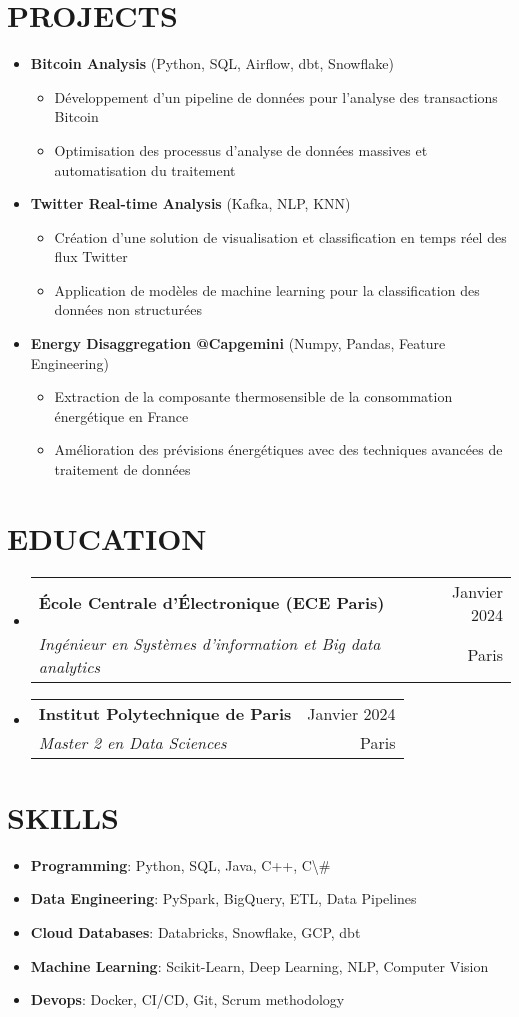 \documentclass[letterpaper,11pt]{article}
\makeatletter
\newcommand{\resumeItem}[1]{
  \item\small{
    {#1 \vspace{-1pt}}
  }
}
\newcommand{\resumeSubheading}[4]{
  \vspace{-1pt}\item
    \begin{tabular*}{\textwidth}[t]{l@{\extracolsep{\fill}}r}
      \textbf{#1} & {\color{dark-grey}\small #2}\vspace{1pt}\\
      \textit{#3} & {\color{dark-grey} \small #4}\\
    \end{tabular*}\vspace{-4pt}
}
\newcommand{\resumeProjectHeading}[2]{
  \item
  {#1} \hfill {#2}
}
\newcommand{\resumeSubHeadingListStart}{\begin{itemize}[leftmargin=0in, label={}]}
\newcommand{\resumeSubHeadingListEnd}{\end{itemize}}
\newcommand{\resumeItemListStart}{\begin{itemize}}
\newcommand{\resumeItemListEnd}{\end{itemize}\vspace{0pt}}
\makeatother
\begin{document}
\section{PROJECTS}
\resumeSubHeadingListStart
      \resumeProjectHeading
          {\textbf{Bitcoin Analysis} \small{(Python, SQL, Airflow, dbt, Snowflake)}} {}
          \resumeItemListStart
            \resumeItem{Développement d'un pipeline de données pour l'analyse des transactions Bitcoin}
            \resumeItem{Optimisation des processus d'analyse de données massives et automatisation du traitement}
          \resumeItemListEnd
      \resumeProjectHeading
          {\textbf{Twitter Real-time Analysis} \small{(Kafka, NLP, KNN)}} {}
          \resumeItemListStart
            \resumeItem{Création d'une solution de visualisation et classification en temps réel des flux Twitter}
            \resumeItem{Application de modèles de machine learning pour la classification des données non structurées}
          \resumeItemListEnd
      \resumeProjectHeading
          {\textbf{Energy Disaggregation @Capgemini} \small{(Numpy, Pandas, Feature Engineering)}} {}
          \resumeItemListStart
            \resumeItem{Extraction de la composante thermosensible de la consommation énergétique en France}
            \resumeItem{Amélioration des prévisions énergétiques avec des techniques avancées de traitement de données}
          \resumeItemListEnd
    \resumeSubHeadingListEnd

\section{EDUCATION}
\resumeSubHeadingListStart
    \resumeSubheading
      {École Centrale d'Électronique (ECE Paris)}{Janvier 2024}
      {Ingénieur en Systèmes d'information et Big data analytics}{Paris}
    \resumeSubheading
      {Institut Polytechnique de Paris}{Janvier 2024}
      {Master 2 en Data Sciences}{Paris}
\resumeSubHeadingListEnd

\section{SKILLS}
\begin{itemize}[leftmargin=0.15in]
    \item \textbf{Programming}: Python, SQL, Java, C++, C\textbackslash{}#
    \item \textbf{Data Engineering}: PySpark, BigQuery, ETL, Data Pipelines
    \item \textbf{Cloud Databases}: Databricks, Snowflake, GCP, dbt
    \item \textbf{Machine Learning}: Scikit-Learn, Deep Learning, NLP, Computer Vision
    \item \textbf{Devops}: Docker, CI/CD, Git, Scrum methodology
\end{itemize}
\end{document}

